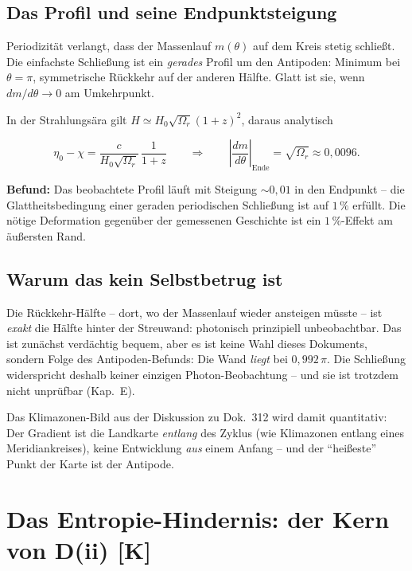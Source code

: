 \documentclass[11pt]{report}
\begin{document}
\section{Das Profil und seine Endpunktsteigung}

Periodizität verlangt, dass der Massenlauf $m(\theta)$ auf dem
Kreis stetig schließt. Die einfachste Schließung ist ein
\emph{gerades} Profil um den Antipoden: Minimum bei $\theta=\pi$,
symmetrische Rückkehr auf der anderen Hälfte. Glatt ist sie, wenn
$dm/d\theta \to 0$ am Umkehrpunkt.

In der Strahlungsära gilt $H \simeq H_0\sqrt{\Omega_r}(1{+}z)^2$,
daraus analytisch

\[
  \eta_0 - \chi = \frac{c}{H_0\sqrt{\Omega_r}}\,\frac{1}{1{+}z}
  \qquad\Longrightarrow\qquad
  \left|\frac{dm}{d\theta}\right|_{\text{Ende}}
  = \sqrt{\Omega_r} \approx 0{,}0096.
\]

\textbf{Befund:} Das beobachtete Profil läuft mit Steigung
$\sim 0{,}01$ in den Endpunkt -- die Glattheitsbedingung einer
geraden periodischen Schließung ist auf $1\,\%$ erfüllt. Die
nötige Deformation gegenüber der gemessenen Geschichte ist ein
$1\,\%$-Effekt am äußersten Rand.

\section{Warum das kein Selbstbetrug ist}

Die Rückkehr-Hälfte -- dort, wo der Massenlauf wieder ansteigen
müsste -- ist \emph{exakt} die Hälfte hinter der Streuwand:
photonisch prinzipiell unbeobachtbar. Das ist zunächst verdächtig
bequem, aber es ist keine Wahl dieses Dokuments, sondern Folge des
Antipoden-Befunds: Die Wand \emph{liegt} bei $0{,}992\,\pi$. Die
Schließung widerspricht deshalb keiner einzigen Photon-Beobachtung
-- und sie ist trotzdem nicht unprüfbar (Kap.~E).

Das Klimazonen-Bild aus der Diskussion zu Dok.~312 wird damit
quantitativ: Der Gradient ist die Landkarte \emph{entlang} des
Zyklus (wie Klimazonen entlang eines Meridiankreises), keine
Entwicklung \emph{aus} einem Anfang -- und der \enquote{heißeste}
Punkt der Karte ist der Antipode.

\chapter{Das Entropie-Hindernis: der Kern von D(ii) [K]}
\end{document}
